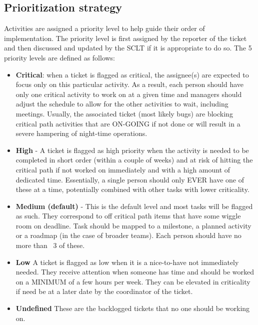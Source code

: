 \documentclass[SE,authoryear,toc]{lsstdoc}
\begin{document}
\subsection{Prioritization strategy}
Activities are assigned a priority level to help guide their order of implementation.
The priority level is first assigned by the reporter of the ticket and then discussed and updated by the SCLT if it is appropriate to do so.
The 5 priority levels are defined as follows:
\begin{itemize}
\item{\bf Critical}: when a ticket is flagged as critical, the assignee(s) are expected to focus only on this particular activity. 
As a result, each person should have only one critical activity to work on at a given time and managers should adjust the schedule to allow for the other activities to wait, including meetings. 
Usually, the associated ticket (most likely bugs) are blocking critical path activities that are ON-GOING if not done or will result in a severe hampering of night-time operations. 

\item{\bf High} - A ticket is flagged as high priority when the activity is needed to be completed in short order (within a couple of weeks) and at risk of hitting the critical path if not worked on immediately and with a high amount of dedicated time. 
Essentially, a single person should only EVER have one of these at a time, potentially combined with other tasks with lower criticality. 

\item{\bf Medium (default)} - This is the default level and most tasks will be flagged as such. 
They correspond to off critical path items that have some wiggle room on deadline. 
Task should be mapped to a milestone, a planned activity or a roadmap (in the case of broader teams).  
Each person should have no more than ~3 of these.

\item{\bf Low} A ticket is flagged as low when it is a nice-to-have not immediately needed. 
They receive attention when someone has time and  should be worked on a MINIMUM of a few hours per week. 
They can be elevated in criticality if need be at a later date by the coordinator of the ticket.  

\item{\bf Undefined} These are the backlogged tickets that no one should be working on.
\end{itemize}
\end{document}
